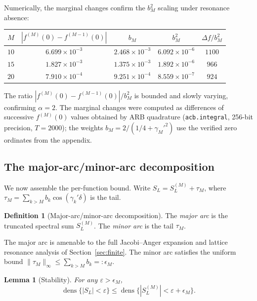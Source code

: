 \documentclass[12pt,reqno]{amsart}
\theoremstyle{plain}
\newtheorem{lemma}[theorem]{Lemma}
\theoremstyle{definition}
\newtheorem{definition}[theorem]{Definition}
\theoremstyle{remark}
\DeclareMathOperator{\dens}{dens}
\begin{document}
Numerically, the marginal changes confirm the $b_M^2$ scaling under resonance absence:

\begin{center}
\renewcommand{\arraystretch}{1.1}
\begin{tabular}{ccccc}
\toprule
$M$ & $|f^{(M)}(0) - f^{(M-1)}(0)|$ & $b_M$ & $b_M^2$ & $\Delta f / b_M^2$ \\
\midrule
$10$ & $6.699 \times 10^{-3}$ & $2.468 \times 10^{-3}$ & $6.092 \times 10^{-6}$ & $1100$ \\
$15$ & $1.827 \times 10^{-3}$ & $1.375 \times 10^{-3}$ & $1.892 \times 10^{-6}$ & $966$ \\
$20$ & $7.910 \times 10^{-4}$ & $9.251 \times 10^{-4}$ & $8.559 \times 10^{-7}$ & $924$ \\
\bottomrule
\end{tabular}
\end{center}

The ratio $|f^{(M)}(0) - f^{(M-1)}(0)|/b_M^2$ is bounded and slowly varying, confirming $\alpha = 2$.  The marginal changes were computed as differences of successive $f^{(M)}(0)$ values obtained by ARB quadrature (\texttt{acb.integral}, 256-bit precision, $T = 2000$); the weights $b_M = 2/(1/4 + {\gamma_M'}^2)$ use the verified zero ordinates from the appendix.


\subsection{The major-arc/minor-arc decomposition}

We now assemble the per-function bound.  Write $S_L = S_L^{(M)} + \tau_M$, where $\tau_M = \sum_{k > M} b_k\cos(\gamma_k'\delta)$ is the tail.

\begin{definition}[Major-arc/minor-arc decomposition]\label{def:major-minor}
The \emph{major arc} is the truncated spectral sum $S_L^{(M)}$.  The \emph{minor arc} is the tail $\tau_M$.
\end{definition}

The major arc is amenable to the full Jacobi--Anger expansion and lattice resonance analysis of Section~\ref{sec:finite}.  The minor arc satisfies the uniform bound $\|\tau_M\|_\infty \leq \sum_{k > M} b_k =: \epsilon_M$.

\begin{lemma}[Stability]\label{lem:stability}
For any $\varepsilon > \epsilon_M$,
\[
  \dens\{|S_L| < \varepsilon\} \leq \dens\{|S_L^{(M)}| < \varepsilon + \epsilon_M\}.
\]
\end{lemma}
\end{document}
